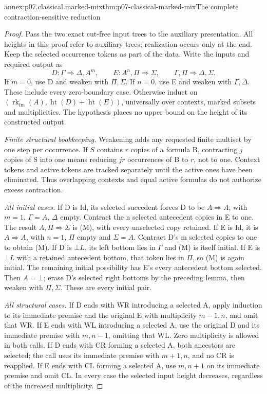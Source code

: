 \begin{annexitem}{annex:p07.classical.marked-mix}{thm:p07-classical-marked-mix}{The complete contraction-sensitive reduction}
\begin{proof}
Pass the two exact cut-free input trees to the auxiliary presentation.
All heights in this proof refer to auxiliary trees; realization occurs
only at the end. Keep the selected occurrence tokens as part of the data.
Write the inputs and required output as
\[
 D:\Gamma\Rightarrow\Delta,A^m,\qquad
 E:A^n,\Pi\Rightarrow\Sigma,
 \qquad \Gamma,\Pi\Rightarrow\Delta,\Sigma. \tag{M}
\]
If \(m=0\), use D and weaken with \(\Pi,\Sigma\). If \(n=0\), use
E and weaken with \(\Gamma,\Delta\). These include every zero-boundary
case. Otherwise induct on
\((\operatorname{rk}_{\mathrm{fm}}(A),\operatorname{ht}(D)+
\operatorname{ht}(E))\), universally over contexts, marked subsets and
multiplicities. The hypothesis places no upper bound on the height of
its constructed output.

\emph{Finite structural bookkeeping.}
Weakening adds any requested finite multiset by one step per occurrence.
If \(S\) contains \(r\) copies of a formula B, contracting \(j\) copies
of S into one means reducing \(jr\) occurrences of B to \(r\), not to
one. Context tokens and active tokens are tracked separately until the
active ones have been eliminated. Thus overlapping contexts and equal
active formulas do not authorize excess contraction.

\emph{All initial cases.}
If D is Id, its selected succedent forces D to be
\(A\Rightarrow A\), with \(m=1\), \(\Gamma=A\), \(\Delta\) empty.
Contract the n selected antecedent copies in E to one. The result
\(A,\Pi\Rightarrow\Sigma\) is (M), with every unselected copy retained.
If E is Id, it is \(A\Rightarrow A\), with \(n=1\), \(\Pi\) empty
and \(\Sigma=A\). Contract D's m selected copies to one to obtain (M).
If D is \(\bot L\), its left bottom lies in \(\Gamma\) and (M) is
itself initial. If E is \(\bot L\) with a retained antecedent bottom,
that token lies in \(\Pi\), so (M) is again initial. The remaining
initial possibility has E's every antecedent bottom selected. Then
\(A=\bot\); erase D's selected right bottoms by the preceding lemma,
then weaken with \(\Pi,\Sigma\). These are every initial pair.

\emph{All structural cases.}
If D ends with WR introducing a selected A, apply induction to its
immediate premise and the original E with multiplicity \(m-1,n\), and
omit that WR. If E ends with WL introducing a selected A, use the
original D and its immediate premise with \(m,n-1\), omitting that WL.
Zero multiplicity is allowed in both calls.
If D ends with CR forming a selected A, both ancestors are selected;
the call uses its immediate premise with \(m+1,n\), and no CR is
reapplied. If E ends with CL forming a selected A, use \(m,n+1\)
on its immediate premise and omit CL. In every case the selected input
height decreases, regardless of the increased multiplicity.


\end{proof}
\end{annexitem}
